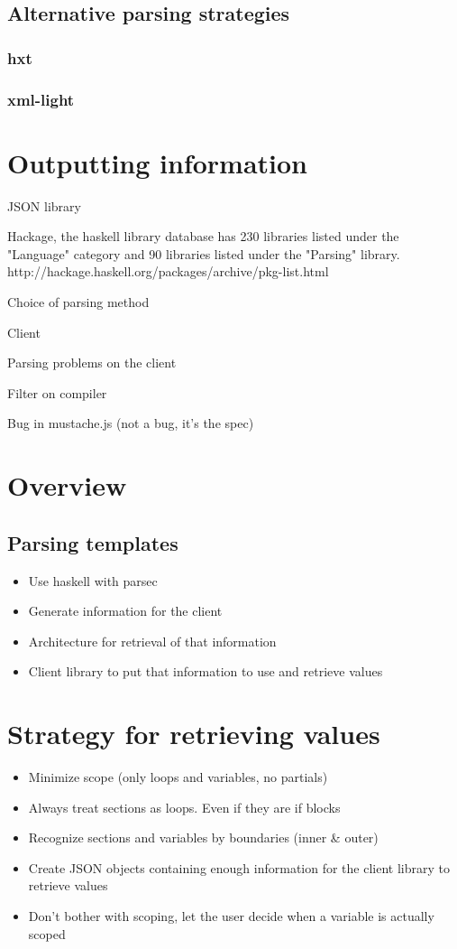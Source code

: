 \subsection{Alternative parsing strategies}
\subsubsection{hxt}
\subsubsection{xml-light}

\section{Outputting information}
JSON library

Hackage, the haskell library database has 230 libraries listed under the
"Language" category and 90 libraries listed under the "Parsing" library.
http://hackage.haskell.org/packages/archive/pkg-list.html


Choice of parsing method

Client

Parsing problems on the client

Filter on compiler

Bug in mustache.js (not a bug, it's the spec)
\section{Overview}
\subsection{Parsing templates}

\begin{itemize}
\item Use haskell with parsec
\item Generate information for the client
\item Architecture for retrieval of that information
\item Client library to put that information to use and retrieve values
\end{itemize}

\section{Strategy for retrieving values}
\begin{itemize}
\item Minimize scope (only loops and variables, no partials)
\item Always treat sections as loops. Even if they are if blocks
\item Recognize sections and variables by boundaries (inner \& outer)
\item Create JSON objects containing enough information for the client library to retrieve values
\item Don't bother with scoping, let the user decide when a variable is actually scoped
\end{itemize}

